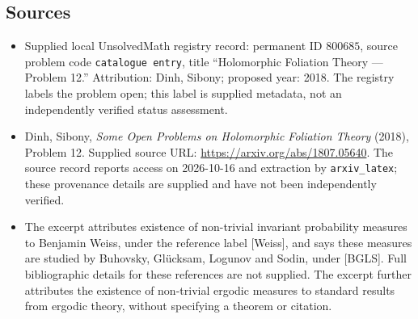 \documentclass[11pt]{article}
\begin{document}
\subsection{Sources}
\begin{itemize}
\item Supplied local UnsolvedMath registry record: permanent ID $800685$, source problem code \texttt{catalogue entry}, title ``Holomorphic Foliation Theory --- Problem 12.'' Attribution: Dinh, Sibony; proposed year: 2018. The registry labels the problem open; this label is supplied metadata, not an independently verified status assessment.
\item Dinh, Sibony, \emph{Some Open Problems on Holomorphic Foliation Theory} (2018), Problem 12. Supplied source URL: \url{https://arxiv.org/abs/1807.05640}. The source record reports access on 2026-10-16 and extraction by \texttt{arxiv\_latex}; these provenance details are supplied and have not been independently verified.
\item The excerpt attributes existence of non-trivial invariant probability measures to Benjamin Weiss, under the reference label [Weiss], and says these measures are studied by Buhovsky, Gl\"ucksam, Logunov and Sodin, under [BGLS]. Full bibliographic details for these references are not supplied. The excerpt further attributes the existence of non-trivial ergodic measures to standard results from ergodic theory, without specifying a theorem or citation.
\end{itemize}
\end{document}

